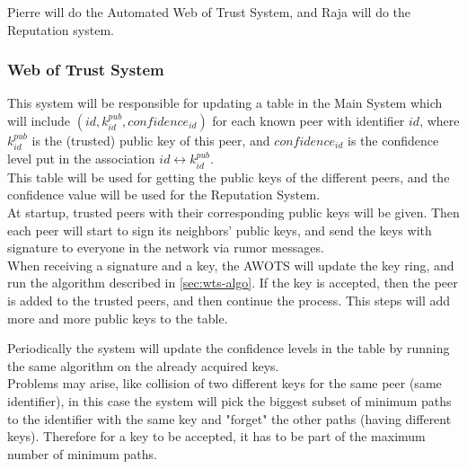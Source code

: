\documentclass[]{article}
\begin{document}
\noindent
Pierre will do the Automated Web of Trust System, and Raja will do the Reputation system.

\subsubsection{Web of Trust System}
This system will be responsible for updating a table in the Main System which will include $(id, k^{pub}_{id}, confidence_{id})$ for each known peer with identifier $id$, where $k^{pub}_{id}$ is the (trusted) public key of this peer, and $confidence_{id}$ is the confidence level put in the association $id \leftrightarrow k^{pub}_{id}$. \\
This table will be used for getting the public keys of the different peers, and the confidence value will be used for the Reputation System. \\

At startup, trusted peers with their corresponding public keys will be given. Then each peer will start to sign its neighbors' public keys, and send the keys with signature to everyone in the network via rumor messages. \\
When receiving a signature and a key, the AWOTS will update the key ring, and run the algorithm described in \ref{sec:wts-algo}. If the key is accepted, then the peer is added to the trusted peers, and then continue the process.
This steps will add more and more public keys to the table. 

Periodically the system will update the confidence levels in the table by running the same algorithm on the already acquired keys. \\

Problems may arise, like collision of two different keys for the same peer (same identifier), in this case the system will pick the biggest subset of minimum paths to the identifier with the same key and "forget" the other paths (having different keys). Therefore for a key to be accepted, it has to be part of the maximum number of minimum paths.
\end{document}
